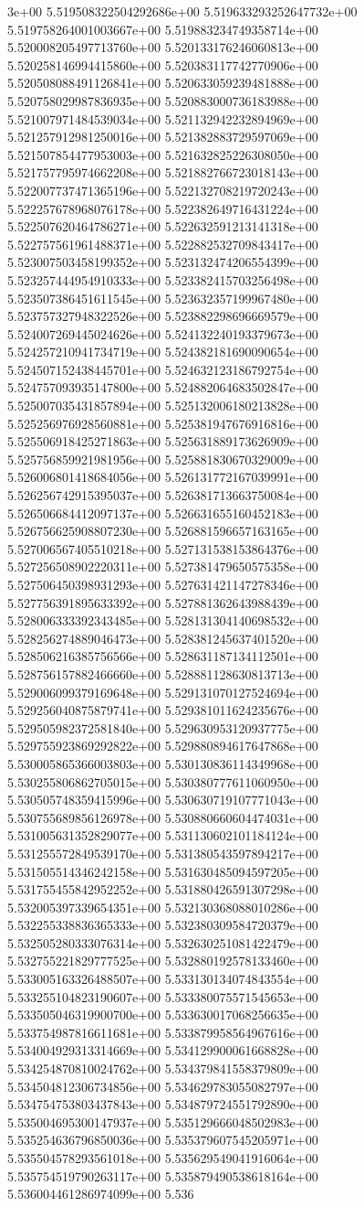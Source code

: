 3e+00	5.519508322504292686e+00	5.519633293252647732e+00	5.519758264001003667e+00	5.519883234749358714e+00	5.520008205497713760e+00	5.520133176246060813e+00	5.520258146994415860e+00	5.520383117742770906e+00	5.520508088491126841e+00	5.520633059239481888e+00	5.520758029987836935e+00	5.520883000736183988e+00	5.521007971484539034e+00	5.521132942232894969e+00	5.521257912981250016e+00	5.521382883729597069e+00	5.521507854477953003e+00	5.521632825226308050e+00	5.521757795974662208e+00	5.521882766723018143e+00	5.522007737471365196e+00	5.522132708219720243e+00	5.522257678968076178e+00	5.522382649716431224e+00	5.522507620464786271e+00	5.522632591213141318e+00	5.522757561961488371e+00	5.522882532709843417e+00	5.523007503458199352e+00	5.523132474206554399e+00	5.523257444954910333e+00	5.523382415703256498e+00	5.523507386451611545e+00	5.523632357199967480e+00	5.523757327948322526e+00	5.523882298696669579e+00	5.524007269445024626e+00	5.524132240193379673e+00	5.524257210941734719e+00	5.524382181690090654e+00	5.524507152438445701e+00	5.524632123186792754e+00	5.524757093935147800e+00	5.524882064683502847e+00	5.525007035431857894e+00	5.525132006180213828e+00	5.525256976928560881e+00	5.525381947676916816e+00	5.525506918425271863e+00	5.525631889173626909e+00	5.525756859921981956e+00	5.525881830670329009e+00	5.526006801418684056e+00	5.526131772167039991e+00	5.526256742915395037e+00	5.526381713663750084e+00	5.526506684412097137e+00	5.526631655160452183e+00	5.526756625908807230e+00	5.526881596657163165e+00	5.527006567405510218e+00	5.527131538153864376e+00	5.527256508902220311e+00	5.527381479650575358e+00	5.527506450398931293e+00	5.527631421147278346e+00	5.527756391895633392e+00	5.527881362643988439e+00	5.528006333392343485e+00	5.528131304140698532e+00	5.528256274889046473e+00	5.528381245637401520e+00	5.528506216385756566e+00	5.528631187134112501e+00	5.528756157882466660e+00	5.528881128630813713e+00	5.529006099379169648e+00	5.529131070127524694e+00	5.529256040875879741e+00	5.529381011624235676e+00	5.529505982372581840e+00	5.529630953120937775e+00	5.529755923869292822e+00	5.529880894617647868e+00	5.530005865366003803e+00	5.530130836114349968e+00	5.530255806862705015e+00	5.530380777611060950e+00	5.530505748359415996e+00	5.530630719107771043e+00	5.530755689856126978e+00	5.530880660604474031e+00	5.531005631352829077e+00	5.531130602101184124e+00	5.531255572849539170e+00	5.531380543597894217e+00	5.531505514346242158e+00	5.531630485094597205e+00	5.531755455842952252e+00	5.531880426591307298e+00	5.532005397339654351e+00	5.532130368088010286e+00	5.532255338836365333e+00	5.532380309584720379e+00	5.532505280333076314e+00	5.532630251081422479e+00	5.532755221829777525e+00	5.532880192578133460e+00	5.533005163326488507e+00	5.533130134074843554e+00	5.533255104823190607e+00	5.533380075571545653e+00	5.533505046319900700e+00	5.533630017068256635e+00	5.533754987816611681e+00	5.533879958564967616e+00	5.534004929313314669e+00	5.534129900061668828e+00	5.534254870810024762e+00	5.534379841558379809e+00	5.534504812306734856e+00	5.534629783055082797e+00	5.534754753803437843e+00	5.534879724551792890e+00	5.535004695300147937e+00	5.535129666048502983e+00	5.535254636796850036e+00	5.535379607545205971e+00	5.535504578293561018e+00	5.535629549041916064e+00	5.535754519790263117e+00	5.535879490538618164e+00	5.536004461286974099e+00	5.536